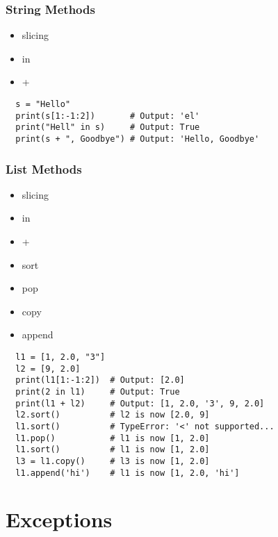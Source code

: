 \documentclass[11pt]{article}
\begin{document}
\subsubsection{String Methods}
\vspace{-0.6cm}
\begin{multicols}{4}
  \begin{itemize}
      \item slicing
      \item in
      \item +
  \end{itemize}
\end{multicols}
\vspace{-0.4cm}
\begin{lstlisting}
  s = "Hello"
  print(s[1:-1:2])       # Output: 'el'
  print("Hell" in s)     # Output: True
  print(s + ", Goodbye") # Output: 'Hello, Goodbye'
\end{lstlisting}

\subsubsection{List Methods}
\vspace{-0.6cm}
\begin{multicols}{4}
  \begin{itemize}
      \item slicing
      \item in
      \item +
      \item sort
      \item pop
      \item copy
      \item append
  \end{itemize}
\end{multicols}
\vspace{-0.4cm}
\begin{lstlisting}
  l1 = [1, 2.0, "3"]
  l2 = [9, 2.0]
  print(l1[1:-1:2])  # Output: [2.0]
  print(2 in l1)     # Output: True
  print(l1 + l2)     # Output: [1, 2.0, '3', 9, 2.0]
  l2.sort()          # l2 is now [2.0, 9]
  l1.sort()          # TypeError: '<' not supported...
  l1.pop()           # l1 is now [1, 2.0]
  l1.sort()          # l1 is now [1, 2.0]
  l3 = l1.copy()     # l3 is now [1, 2.0]
  l1.append('hi')    # l1 is now [1, 2.0, 'hi']
\end{lstlisting}

\pagebreak

\section{Exceptions}
\end{document}
